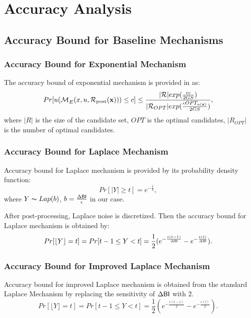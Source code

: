 \documentclass{article}
\begin{document}
\section{Accuracy Analysis}

\subsection{Accuracy Bound for Baseline Mechanisms}

\subsubsection{Accuracy Bound for Exponential Mechanism}
\label{subsec_accuracy_global}
The accuracy bound of exponential mechanism is provided in \cite{dwork2014algorithmic} as:
\begin{equation*}
Pr[u(\mathcal{M}_E^{}({x},{u},{\mathcal{R}_{\textup{post}}(\textbf{x})})) \leq c] 
		 \leq \frac{|\mathcal{R}|exp(\frac{\epsilon c}{2 GS})}{|\mathcal{R}_{OPT}| exp(\frac{\epsilon OPT_{u(\textbf{x})}}{2 GS})},
\end{equation*}
where $|R|$ is the size of the candidate set, $OPT$ is the optimal candidates, $|R_{OPT}|$ is the number of optimal candidates.


\subsubsection{Accuracy Bound for Laplace Mechanism}
\label{subsec_accuracy_lap}
Accuracy bound for Laplace mechanism is provided by its probability density function:
\begin{equation*}
Pr[|Y| \geq t] = e^{- \frac{t}{b}},
\end{equation*}
where $Y \thicksim Lap(b)$, $b = \frac{\Delta \mathsf{BI}}{\epsilon}$ in our case.

After post-processing, Laplace noise is discretized. Then the accuracy bound for Laplace mechanism is obtained by:
\[
Pr[\lfloor Y \rfloor = t] = Pr[ t-1 \leq Y < t] = \frac{1}{2} (e^{- \frac{\epsilon (t - 1)}{\Delta \mathsf{BI}}} - e^{- \frac{\epsilon (t)}{\Delta \mathsf{BI}}}).
\]

\subsubsection{Accuracy Bound for Improved Laplace Mechanism}
\label{subsec_accuracy_lap}
Accuracy bound for improved Laplace mechanism is obtained from the standard Laplace Mechanism by replacing the sensitivity of $\Delta \mathsf{BI}$ with $2$.
\[
Pr[\lfloor Y \rfloor = t] = Pr[ t-1 \leq Y < t] = \frac{1}{2} (e^{- \frac{\epsilon (t - 1)}{2}} - e^{- \frac{\epsilon (t)}{2}}).
\]
\end{document}
